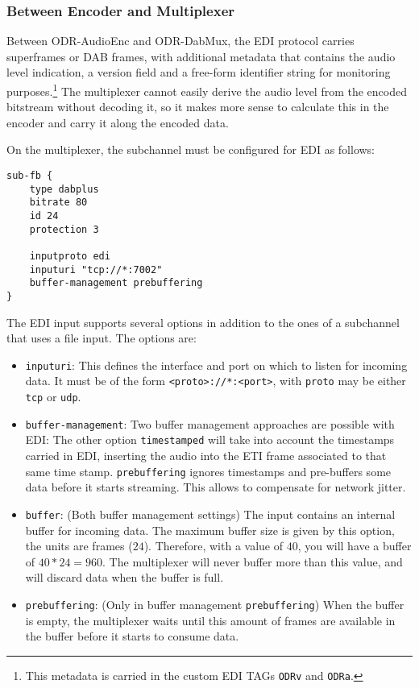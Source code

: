 \subsubsection{Between Encoder and Multiplexer}
\label{sec:between_encoder_and_multiplexer}

Between ODR-AudioEnc and ODR-DabMux, the EDI protocol carries \dabplus{}
superframes or DAB frames, with additional metadata that contains the audio
level indication, a version field and a free-form identifier string for
monitoring purposes.\footnote{This metadata is carried in the custom EDI TAGs
\texttt{ODRv} and \texttt{ODRa}.}
The multiplexer cannot easily derive the audio level from the encoded bitstream
without decoding it, so it makes more sense to calculate this in the encoder and
carry it along the encoded data.

On the multiplexer, the subchannel must be configured for EDI as follows:
\begin{lstlisting}
sub-fb {
    type dabplus
    bitrate 80
    id 24
    protection 3

    inputproto edi
    inputuri "tcp://*:7002"
    buffer-management prebuffering
}
\end{lstlisting}

The EDI input supports several options in addition to the ones of a
subchannel that uses a file input. The options are:

\begin{itemize}
    \item \texttt{inputuri}: This defines the interface and port on which to
        listen for incoming data. It must be of the form
        \texttt{<proto>://*:<port>}, with \texttt{proto} may be either
        \texttt{tcp} or \texttt{udp}.

    \item \texttt{buffer-management}: Two buffer management approaches are
        possible with EDI:
        The other option \texttt{timestamped} will take
        into account the timestamps carried in EDI, inserting the audio into the
        ETI frame associated to that same time stamp.
        \texttt{prebuffering} ignores timestamps and
        pre-buffers some data before it starts streaming. This allows to
        compensate for network jitter.

    \item \texttt{buffer}: (Both buffer management settings)
        The input contains an internal buffer for
        incoming data. The maximum buffer size is given by this option, the
        units are frames ($24$\ms). Therefore, with a value of $40$, you
        will have a buffer of $40 * 24 = 960$\ms. The multiplexer will never
        buffer more than this value, and will discard data when the buffer is
        full.

    \item \texttt{prebuffering}: (Only in buffer management \texttt{prebuffering})
        When the buffer is empty, the multiplexer
        waits until this amount of frames are available in the buffer
        before it starts to consume data.
\end{itemize}

